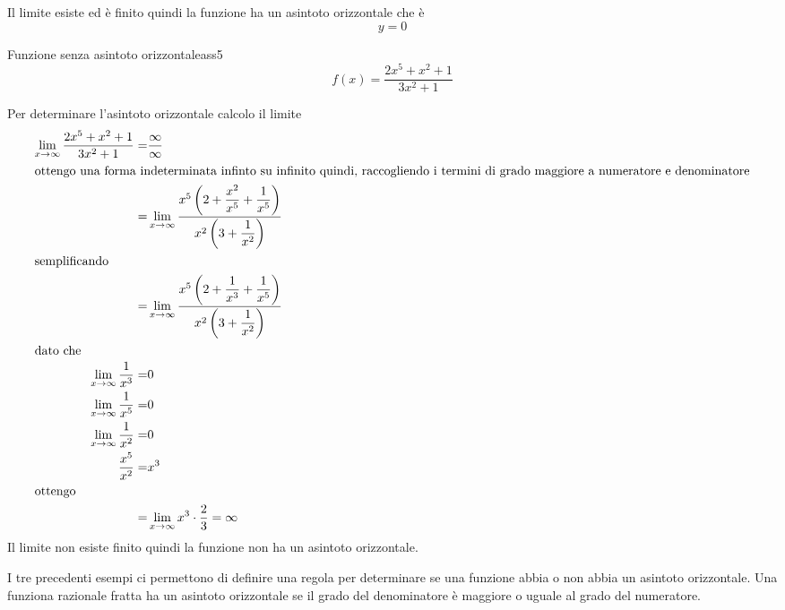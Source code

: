 Il limite esiste ed è finito quindi la funzione ha un asintoto orizzontale che è \[y=0\]
\begin{cesempiot}{Funzione senza asintoto orizzontale}{ass5}
	\[f(x)=\dfrac{2x^5+x^2+1}{3x^2+1}\]
\end{cesempiot}
Per determinare l'asintoto orizzontale calcolo il limite 
\begin{align*}\index{Forma!indeterminata!infinito su infinito}
\lim_{x\to \infty}\dfrac{2x^5+x^2+1}{3x^2+1}=&\dfrac{\infty}{\infty}\\
\intertext{ottengo una forma indeterminata infinto su infinito quindi, raccogliendo i termini di grado maggiore a numeratore e denominatore}
=&\lim_{x\to \infty}\dfrac{x^5\left(2+\dfrac{x^2}{x^5}+\dfrac{1}{x^5}\right)}{x^2\left(3+\dfrac{1}{x^2}\right)}\\
\intertext{semplificando}
=&\lim_{x\to \infty}\dfrac{x^5\left(2+\dfrac{1}{x^3}+\dfrac{1}{x^5}\right)}{x^2\left(3+\dfrac{1}{x^2}\right)}\\
\intertext{dato che}
\lim_{x\to \infty}\dfrac{1}{x^3}=&0\\
\lim_{x\to \infty}\dfrac{1}{x^5}=&0\\
\lim_{x\to \infty}\dfrac{1}{x^2}=&0\\
\dfrac{x^5}{x^2}=&x^3\\
\intertext{ottengo}
=&\lim_{x\to \infty}x^3\cdot\dfrac{2}{3}=\infty\\
\end{align*}
Il limite non esiste  finito quindi la funzione non ha un asintoto orizzontale.

I tre precedenti esempi ci permettono di definire una regola per determinare se una funzione abbia o non abbia un asintoto orizzontale. Una funziona razionale fratta ha un asintoto orizzontale se il grado del denominatore è maggiore o uguale al grado del numeratore. 
